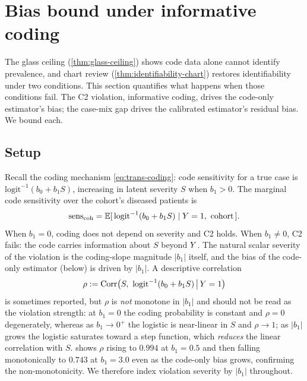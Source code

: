 \section{Bias bound under informative coding}
\label{sec:methodology}

The glass ceiling (\cref{thm:glass-ceiling}) shows code data alone
cannot identify prevalence, and chart review
(\cref{thm:identifiability-chart}) restores identifiability under two
conditions. This section quantifies what happens when those conditions
fail. The C2 violation, informative coding, drives the code-only
estimator's bias; the case-mix gap drives the calibrated estimator's
residual bias. We bound each.

\subsection{Setup}

Recall the coding mechanism \eqref{eq:trans-coding}: code sensitivity
for a true case is $\mathrm{logit}^{-1}(b_0 + b_1 S)$, increasing in
latent severity $S$ when $b_1 > 0$. The marginal code sensitivity over
the cohort's diseased patients is
\begin{equation}
  \mathrm{sens}_{\text{coh}}
    = \E[\,\mathrm{logit}^{-1}(b_0 + b_1 S) \mid \Y = 1,\ \text{cohort}\,].
  \label{eq:meth-sens}
\end{equation}
When $b_1 = 0$, coding does not depend on severity and C2 holds. When
$b_1 \neq 0$, C2 fails: the code carries information about $S$ beyond
$Y$. The natural scalar severity of the violation is the
coding-slope magnitude $|b_1|$ itself, and the bias of the code-only
estimator (below) is driven by $|b_1|$. A descriptive correlation
\begin{equation}
  \rho := \mathrm{Corr}\big(S,\ \mathrm{logit}^{-1}(b_0 + b_1 S)
                              \,\big|\, Y = 1\big)
  \label{eq:meth-rho}
\end{equation}
is sometimes reported, but $\rho$ is \emph{not} monotone in $|b_1|$
and should not be read as the violation strength: at $b_1 = 0$ the
coding probability is constant and $\rho = 0$ degenerately, whereas
as $b_1 \to 0^{+}$ the logistic is near-linear in $S$ and
$\rho \to 1$; as $|b_1|$ grows the logistic saturates toward a step
function, which \emph{reduces} the linear correlation with $S$.
 shows $\rho$ rising to $0.994$ at $b_1 = 0.5$
and then falling monotonically to $0.743$ at $b_1 = 3.0$ even as the
code-only bias grows, confirming the non-monotonicity. We therefore
index violation severity by $|b_1|$ throughout.

